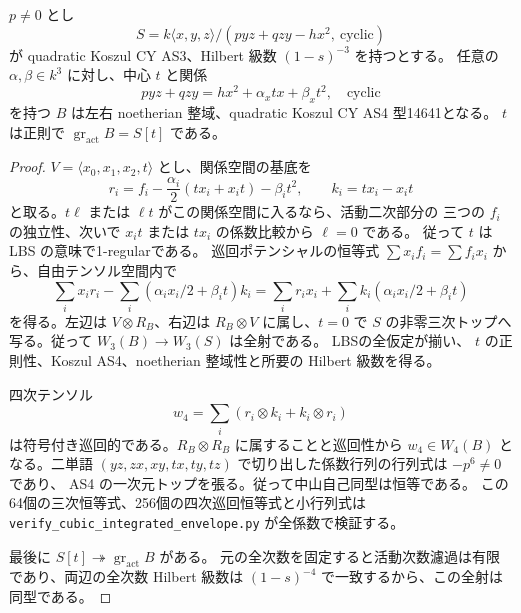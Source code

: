 \begin{lemma}
\label{lem:integrated-general-envelope}
$p\ne0$ とし
\[
 S=k\langle x,y,z\rangle/(pyz+qzy-hx^2,\ \text{cyclic})
\]
が quadratic Koszul CY AS3、Hilbert 級数 $(1-s)^{-3}$ を持つとする。
任意の $\alpha,\beta\in k^3$ に対し、中心 $t$ と関係
\[
 pyz+qzy=hx^2+\alpha_x tx+\beta_xt^2,\quad\text{cyclic}
\]
を持つ $B$ は左右 noetherian 整域、quadratic Koszul CY AS4 型14641となる。
$t$ は正則で
$\operatorname{gr}_{\mathrm{act}}B=S[t]$ である。
\end{lemma}
\begin{proof}
$V=\langle x_0,x_1,x_2,t\rangle$ とし、関係空間の基底を
\[
 r_i=f_i-\frac{\alpha_i}{2}(tx_i+x_it)-\beta_it^2,\qquad
 k_i=tx_i-x_it
\]
と取る。$t\ell$ または $\ell t$ がこの関係空間に入るなら、活動二次部分の
三つの $f_i$ の独立性、次いで $x_it$ または $tx_i$ の係数比較から $\ell=0$ である。
従って $t$ は LBS の意味で1-regularである。
巡回ポテンシャルの恒等式 $\sum x_if_i=\sum f_ix_i$ から、自由テンソル空間内で
\[
 \sum_i x_i r_i-\sum_i(\alpha_i x_i/2+\beta_it)k_i
 =\sum_i r_i x_i+\sum_i k_i(\alpha_i x_i/2+\beta_it)
\]
を得る。左辺は $V\otimes R_B$、右辺は $R_B\otimes V$ に属し、$t=0$ で
$S$ の非零三次トップへ写る。従って $W_3(B)\to W_3(S)$ は全射である。
LBS\cite[Theorem 2.6, Corollary 2.7]{LBS}の全仮定が揃い、
$t$ の正則性、Koszul AS4、noetherian 整域性と所要の Hilbert 級数を得る。

四次テンソル
\[
 w_4=\sum_i(r_i\otimes k_i+k_i\otimes r_i)
\]
は符号付き巡回的である。$R_B\otimes R_B$ に属することと巡回性から
$w_4\in W_4(B)$ となる。二単語
$(yz,zx,xy,tx,ty,tz)$ で切り出した係数行列の行列式は $-p^6\ne0$ であり、
AS4 の一次元トップを張る。従って中山自己同型は恒等である。
この64個の三次恒等式、256個の四次巡回恒等式と小行列式は
\texttt{verify\_cubic\_integrated\_envelope.py} が全係数で検証する。

最後に $S[t]\twoheadrightarrow\operatorname{gr}_{\mathrm{act}}B$ がある。
元の全次数を固定すると活動次数濾過は有限であり、両辺の全次数 Hilbert 級数は
$(1-s)^{-4}$ で一致するから、この全射は同型である。
\end{proof}

